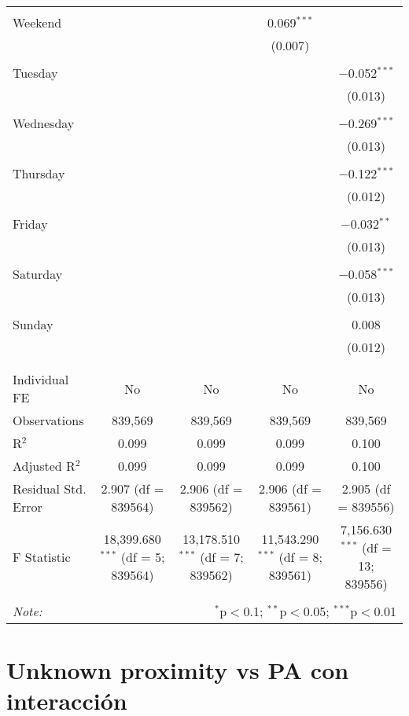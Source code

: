 \documentclass[
]{article}
\begin{document}
\begin{table}[!htbp]
{\begin{tabular}{@{\extracolsep{5pt}}lcccc}
  & & & & \\ 
 Weekend &  &  & 0.069$^{***}$ &  \\ 
  &  &  & (0.007) &  \\ 
  & & & & \\ 
 Tuesday &  &  &  & $-$0.052$^{***}$ \\ 
  &  &  &  & (0.013) \\ 
  & & & & \\ 
 Wednesday &  &  &  & $-$0.269$^{***}$ \\ 
  &  &  &  & (0.013) \\ 
  & & & & \\ 
 Thursday &  &  &  & $-$0.122$^{***}$ \\ 
  &  &  &  & (0.012) \\ 
  & & & & \\ 
 Friday &  &  &  & $-$0.032$^{**}$ \\ 
  &  &  &  & (0.013) \\ 
  & & & & \\ 
 Saturday &  &  &  & $-$0.058$^{***}$ \\ 
  &  &  &  & (0.013) \\ 
  & & & & \\ 
 Sunday &  &  &  & 0.008 \\ 
  &  &  &  & (0.012) \\ 
  & & & & \\ 
\hline \\[-1.8ex] 
Individual FE & No & No & No & No \\ 
Observations & 839,569 & 839,569 & 839,569 & 839,569 \\ 
R$^{2}$ & 0.099 & 0.099 & 0.099 & 0.100 \\ 
Adjusted R$^{2}$ & 0.099 & 0.099 & 0.099 & 0.100 \\ 
Residual Std. Error & 2.907 (df = 839564) & 2.906 (df = 839562) & 2.906 (df = 839561) & 2.905 (df = 839556) \\ 
F Statistic & 18,399.680$^{***}$ (df = 5; 839564) & 13,178.510$^{***}$ (df = 7; 839562) & 11,543.290$^{***}$ (df = 8; 839561) & 7,156.630$^{***}$ (df = 13; 839556) \\ 
\hline 
\hline \\[-1.8ex] 
\textit{Note:}  & \multicolumn{4}{r}{$^{*}$p$<$0.1; $^{**}$p$<$0.05; $^{***}$p$<$0.01} \\ 
\end{tabular}
} 
\end{table} 
\newpage
\section{Unknown proximity vs PA con interacción}
\end{document}
